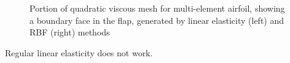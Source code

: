 \documentclass[t,12pt]{beamer}
\begin{document}
\begin{frame}
	 \begin{figure}
	 	\centering
	 	\caption{Portion of quadratic viscous mesh for multi-element airfoil, showing a boundary face in the flap, generated by linear elasticity (left) and RBF (right) methods}
	 	\label{fig:tangled2}
	 \end{figure}
	 Regular linear elasticity does not work.
\end{frame}
\end{document}
